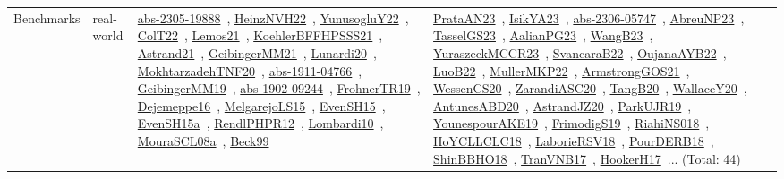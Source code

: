 {\begin{longtable}{lp{3cm}>{\raggedright\arraybackslash}p{6cm}>{\raggedright\arraybackslash}p{6cm}>{\raggedright\arraybackslash}p{8cm}}
Benchmarks & real-world & \href{works/abs-2305-19888.pdf}{abs-2305-19888}~\cite{abs-2305-19888}, \href{works/HeinzNVH22.pdf}{HeinzNVH22}~\cite{HeinzNVH22}, \href{works/YunusogluY22.pdf}{YunusogluY22}~\cite{YunusogluY22}, \href{works/ColT22.pdf}{ColT22}~\cite{ColT22}, \href{works/Lemos21.pdf}{Lemos21}~\cite{Lemos21}, \href{works/KoehlerBFFHPSSS21.pdf}{KoehlerBFFHPSSS21}~\cite{KoehlerBFFHPSSS21}, \href{works/Astrand21.pdf}{Astrand21}~\cite{Astrand21}, \href{works/GeibingerMM21.pdf}{GeibingerMM21}~\cite{GeibingerMM21}, \href{works/Lunardi20.pdf}{Lunardi20}~\cite{Lunardi20}, \href{works/MokhtarzadehTNF20.pdf}{MokhtarzadehTNF20}~\cite{MokhtarzadehTNF20}, \href{works/abs-1911-04766.pdf}{abs-1911-04766}~\cite{abs-1911-04766}, \href{works/GeibingerMM19.pdf}{GeibingerMM19}~\cite{GeibingerMM19}, \href{works/abs-1902-09244.pdf}{abs-1902-09244}~\cite{abs-1902-09244}, \href{works/FrohnerTR19.pdf}{FrohnerTR19}~\cite{FrohnerTR19}, \href{works/Dejemeppe16.pdf}{Dejemeppe16}~\cite{Dejemeppe16}, \href{works/MelgarejoLS15.pdf}{MelgarejoLS15}~\cite{MelgarejoLS15}, \href{works/EvenSH15.pdf}{EvenSH15}~\cite{EvenSH15}, \href{works/EvenSH15a.pdf}{EvenSH15a}~\cite{EvenSH15a}, \href{works/RendlPHPR12.pdf}{RendlPHPR12}~\cite{RendlPHPR12}, \href{works/Lombardi10.pdf}{Lombardi10}~\cite{Lombardi10}, \href{works/MouraSCL08a.pdf}{MouraSCL08a}~\cite{MouraSCL08a}, \href{works/Beck99.pdf}{Beck99}~\cite{Beck99} & \href{works/PrataAN23.pdf}{PrataAN23}~\cite{PrataAN23}, \href{works/IsikYA23.pdf}{IsikYA23}~\cite{IsikYA23}, \href{works/abs-2306-05747.pdf}{abs-2306-05747}~\cite{abs-2306-05747}, \href{works/AbreuNP23.pdf}{AbreuNP23}~\cite{AbreuNP23}, \href{works/TasselGS23.pdf}{TasselGS23}~\cite{TasselGS23}, \href{works/AalianPG23.pdf}{AalianPG23}~\cite{AalianPG23}, \href{works/WangB23.pdf}{WangB23}~\cite{WangB23}, \href{works/YuraszeckMCCR23.pdf}{YuraszeckMCCR23}~\cite{YuraszeckMCCR23}, \href{works/SvancaraB22.pdf}{SvancaraB22}~\cite{SvancaraB22}, \href{works/OujanaAYB22.pdf}{OujanaAYB22}~\cite{OujanaAYB22}, \href{works/LuoB22.pdf}{LuoB22}~\cite{LuoB22}, \href{works/MullerMKP22.pdf}{MullerMKP22}~\cite{MullerMKP22}, \href{works/ArmstrongGOS21.pdf}{ArmstrongGOS21}~\cite{ArmstrongGOS21}, \href{works/WessenCS20.pdf}{WessenCS20}~\cite{WessenCS20}, \href{works/ZarandiASC20.pdf}{ZarandiASC20}~\cite{ZarandiASC20}, \href{works/TangB20.pdf}{TangB20}~\cite{TangB20}, \href{works/WallaceY20.pdf}{WallaceY20}~\cite{WallaceY20}, \href{works/AntunesABD20.pdf}{AntunesABD20}~\cite{AntunesABD20}, \href{works/AstrandJZ20.pdf}{AstrandJZ20}~\cite{AstrandJZ20}, \href{works/ParkUJR19.pdf}{ParkUJR19}~\cite{ParkUJR19}, \href{works/YounespourAKE19.pdf}{YounespourAKE19}~\cite{YounespourAKE19}, \href{works/FrimodigS19.pdf}{FrimodigS19}~\cite{FrimodigS19}, \href{works/RiahiNS018.pdf}{RiahiNS018}~\cite{RiahiNS018}, \href{works/HoYCLLCLC18.pdf}{HoYCLLCLC18}~\cite{HoYCLLCLC18}, \href{works/LaborieRSV18.pdf}{LaborieRSV18}~\cite{LaborieRSV18}, \href{works/PourDERB18.pdf}{PourDERB18}~\cite{PourDERB18}, \href{works/ShinBBHO18.pdf}{ShinBBHO18}~\cite{ShinBBHO18}, \href{works/TranVNB17.pdf}{TranVNB17}~\cite{TranVNB17}, \href{works/HookerH17.pdf}{HookerH17}~\cite{HookerH17}... (Total: 44) & 
\end{longtable}}
